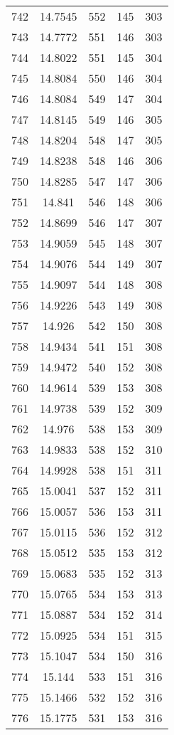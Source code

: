 \documentclass[12pt,a4paper]{article}
\begin{document}
\begin{tabular}{r|cccc}
	742 & 14.7545 & 552 & 145 & 303 \\
	743 & 14.7772 & 551 & 146 & 303 \\
	744 & 14.8022 & 551 & 145 & 304 \\
	745 & 14.8084 & 550 & 146 & 304 \\
	746 & 14.8084 & 549 & 147 & 304 \\
	747 & 14.8145 & 549 & 146 & 305 \\
	748 & 14.8204 & 548 & 147 & 305 \\
	749 & 14.8238 & 548 & 146 & 306 \\
	750 & 14.8285 & 547 & 147 & 306 \\
	751 & 14.841 & 546 & 148 & 306 \\
	752 & 14.8699 & 546 & 147 & 307 \\
	753 & 14.9059 & 545 & 148 & 307 \\
	754 & 14.9076 & 544 & 149 & 307 \\
	755 & 14.9097 & 544 & 148 & 308 \\
	756 & 14.9226 & 543 & 149 & 308 \\
	757 & 14.926 & 542 & 150 & 308 \\
	758 & 14.9434 & 541 & 151 & 308 \\
	759 & 14.9472 & 540 & 152 & 308 \\
	760 & 14.9614 & 539 & 153 & 308 \\
	761 & 14.9738 & 539 & 152 & 309 \\
	762 & 14.976 & 538 & 153 & 309 \\
	763 & 14.9833 & 538 & 152 & 310 \\
	764 & 14.9928 & 538 & 151 & 311 \\
	765 & 15.0041 & 537 & 152 & 311 \\
	766 & 15.0057 & 536 & 153 & 311 \\
	767 & 15.0115 & 536 & 152 & 312 \\
	768 & 15.0512 & 535 & 153 & 312 \\
	769 & 15.0683 & 535 & 152 & 313 \\
	770 & 15.0765 & 534 & 153 & 313 \\
	771 & 15.0887 & 534 & 152 & 314 \\
	772 & 15.0925 & 534 & 151 & 315 \\
	773 & 15.1047 & 534 & 150 & 316 \\
	774 & 15.144 & 533 & 151 & 316 \\
	775 & 15.1466 & 532 & 152 & 316 \\
	776 & 15.1775 & 531 & 153 & 316 \\

\end{tabular}
\end{document}
